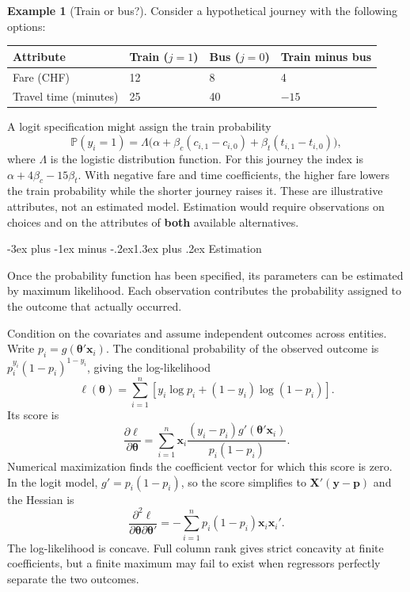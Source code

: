 \documentclass[
  11pt,
]{book}
\makeatletter
\renewcommand\section{\@startsection{section}{1}{\z@}
  {-3ex plus -1ex minus -.2ex}{1.3ex plus .2ex}
  {\normalfont\Large\bfseries\color{TextbookInk}}}
\theoremstyle{definition}
\theoremstyle{definition}
\newtheorem{example}{Example}[chapter]
\theoremstyle{definition}
\theoremstyle{definition}
\theoremstyle{remark}
\makeatother
\begin{document}
\begin{example}[Train or bus?]
\protect\hypertarget{exm:transport-binary}{}\label{exm:transport-binary}Consider a hypothetical journey with the following options:

\begin{longtable}[]{@{}llll@{}}
\toprule\noalign{}
Attribute & Train (\(j=1\)) & Bus (\(j=0\)) & Train minus bus \\
\midrule\noalign{}
\endhead
\bottomrule\noalign{}
\endlastfoot
Fare (CHF) & 12 & 8 & 4 \\
Travel time (minutes) & 25 & 40 & \(-15\) \\
\end{longtable}

A logit specification might assign the train probability
\[
\mathbb{P}(y_i=1)=\Lambda\big(\alpha+\beta_c(c_{i,1}-c_{i,0})+
\beta_t(t_{i,1}-t_{i,0})\big),
\]
where \(\Lambda\) is the logistic distribution function. For this journey the index is \(\alpha+4\beta_c-15\beta_t\). With negative fare and time coefficients, the higher fare lowers the train probability while the shorter journey raises it. These are illustrative attributes, not an estimated model. Estimation would require observations on choices and on the attributes of \textbf{both} available alternatives.
\end{example}

\section{Estimation}\label{binary-estimation}

Once the probability function has been specified, its parameters can be estimated by maximum likelihood. Each observation contributes the probability assigned to the outcome that actually occurred.

Condition on the covariates and assume independent outcomes across entities. Write \(p_i=g(\boldsymbol\theta'\mathbf{x}_i)\). The conditional probability of the observed outcome is \(p_i^{y_i}(1-p_i)^{1-y_i}\), giving the log-likelihood
\[
\ell(\boldsymbol\theta)=\sum_{i=1}^n
\left[y_i\log p_i+(1-y_i)\log(1-p_i)\right].
\]
Its score is
\[
\frac{\partial\ell}{\partial\boldsymbol\theta}
=\sum_{i=1}^n\mathbf{x}_i\frac{(y_i-p_i)g'(\boldsymbol\theta'\mathbf{x}_i)}{p_i(1-p_i)}.
\]
Numerical maximization finds the coefficient vector for which this score is zero. In the logit model, \(g'=p_i(1-p_i)\), so the score simplifies to \(\mathbf{X}'(\mathbf{y}-\mathbf{p})\) and the Hessian is
\[
\frac{\partial^2\ell}{\partial\boldsymbol\theta\partial\boldsymbol\theta'}
=-\sum_{i=1}^n p_i(1-p_i)\mathbf{x}_i\mathbf{x}_i'.
\]
The log-likelihood is concave. Full column rank gives strict concavity at finite coefficients, but a finite maximum may fail to exist when regressors perfectly separate the two outcomes.
\end{document}
